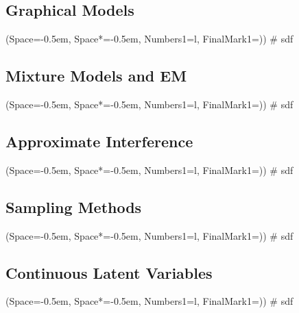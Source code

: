 \documentclass[12pt, a4paper]{article}
\newcommand{\listSpace}{-0.5em}%
\begin{document}
\subsection{Graphical Models}
\begin{easylist}[itemize]
	\ListProperties(Space=\listSpace, Space*=\listSpace, Numbers1=l, FinalMark1={)})
	# sdf
\end{easylist}

\subsection{Mixture Models and EM}
\begin{easylist}[itemize]
	\ListProperties(Space=\listSpace, Space*=\listSpace, Numbers1=l, FinalMark1={)})
	# sdf
\end{easylist}

\subsection{Approximate Interference}
\begin{easylist}[itemize]
	\ListProperties(Space=\listSpace, Space*=\listSpace, Numbers1=l, FinalMark1={)})
	# sdf
\end{easylist}

\subsection{Sampling Methods}
\begin{easylist}[itemize]
	\ListProperties(Space=\listSpace, Space*=\listSpace, Numbers1=l, FinalMark1={)})
	# sdf
\end{easylist}

\subsection{Continuous Latent Variables}
\begin{easylist}[itemize]
	\ListProperties(Space=\listSpace, Space*=\listSpace, Numbers1=l, FinalMark1={)})
	# sdf
\end{easylist}
\end{document}
